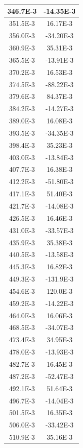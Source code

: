 \documentclass[english, 12pt, a4paper]{ifimaster}
\begin{document}
\begin{appendices}
\begin{center}
\begin{longtable}[htbp]{|c|c|}
\hline
  346.7E-3 & -14.35E-3 \\
\hline
  351.5E-3 & 16.17E-3 \\
\hline
  356.0E-3 & -34.20E-3 \\
\hline
  360.9E-3 & 35.31E-3 \\
\hline
  365.5E-3 & -13.91E-3 \\
\hline
  370.2E-3 & 16.53E-3 \\
\hline
  374.5E-3 & -88.22E-3 \\
\hline
  379.6E-3 & 84.37E-3 \\
\hline
  384.2E-3 & -14.27E-3 \\
\hline
  389.0E-3 & 16.08E-3 \\
\hline
  393.5E-3 & -34.35E-3 \\
\hline
  398.4E-3 & 35.23E-3 \\
\hline
  403.0E-3 & -13.84E-3 \\
\hline
  407.7E-3 & 16.38E-3 \\
\hline
  412.2E-3 & -51.80E-3 \\
\hline
  417.1E-3 & 51.40E-3 \\
\hline
  421.7E-3 & -14.08E-3 \\
\hline
  426.5E-3 & 16.46E-3 \\
\hline
  431.0E-3 & -33.57E-3 \\
\hline
  435.9E-3 & 35.38E-3 \\
\hline
  440.5E-3 & -13.58E-3 \\
\hline
  445.3E-3 & 16.82E-3 \\
\hline
  449.3E-3 & -131.9E-3 \\
\hline
  454.6E-3 & 120.0E-3 \\
\hline
  459.2E-3 & -14.22E-3 \\
\hline
  464.0E-3 & 16.06E-3 \\
\hline
  468.5E-3 & -34.07E-3 \\
\hline
  473.4E-3 & 34.95E-3 \\
\hline
  478.0E-3 & -13.93E-3 \\
\hline
  482.7E-3 & 16.45E-3 \\
\hline
  487.2E-3 & -52.47E-3 \\
\hline
  492.1E-3 & 51.64E-3 \\
\hline
  496.7E-3 & -14.04E-3 \\
\hline
  501.5E-3 & 16.35E-3 \\
\hline
  506.0E-3 & -33.42E-3 \\
\hline
  510.9E-3 & 35.16E-3 \\

\end{longtable}
\end{center}
\end{appendices}
\end{document}
